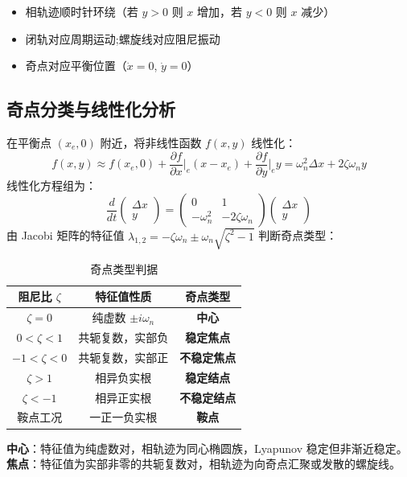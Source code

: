 \begin{itemize}
    \item 相轨迹顺时针环绕（若 $y>0$ 则 $x$ 增加，若 $y<0$ 则 $x$ 减少）
    \item 闭轨对应周期运动;螺旋线对应阻尼振动
    \item 奇点对应平衡位置（$\dot{x}=0$, $\dot{y}=0$）
\end{itemize}

\subsection{奇点分类与线性化分析}
在平衡点 $(x_e, 0)$ 附近，将非线性函数 $f(x,y)$ 线性化：
\[
f(x, y) \approx f(x_e, 0) + \frac{\partial f}{\partial x}\bigg|_{e}(x-x_e) + \frac{\partial f}{\partial y}\bigg|_{e} y = \omega_n^{2} \Delta x + 2\zeta \omega_n y
\]
线性化方程组为：
\[
\frac{d}{dt}\begin{pmatrix} \Delta x \\ y \end{pmatrix} = \begin{pmatrix} 0 & 1 \\ -\omega_n^{2} & -2\zeta\omega_n \end{pmatrix} \begin{pmatrix} \Delta x \\ y \end{pmatrix}
\]
由 Jacobi 矩阵的特征值 $\lambda_{1,2} = -\zeta\omega_n \pm \omega_n\sqrt{\zeta^{2}-1}$ 判断奇点类型：

\begin{table}[H]
\centering
\caption{奇点类型判据}
\begin{tabular}{ccc}
\toprule
阻尼比 $\zeta$ & 特征值性质 & 奇点类型 \\
\midrule
$\zeta = 0$ & 纯虚数 $\pm i\omega_n$ & \textbf{中心} \\
$0 < \zeta < 1$ & 共轭复数，实部负 & \textbf{稳定焦点} \\
$-1 < \zeta < 0$ & 共轭复数，实部正 & \textbf{不稳定焦点} \\
$\zeta > 1$ & 相异负实根 & \textbf{稳定结点} \\
$\zeta < -1$ & 相异正实根 & \textbf{不稳定结点} \\
鞍点工况 & 一正一负实根 & \textbf{鞍点} \\
\bottomrule
\end{tabular}
\label{tab:ch10_singular_pts}
\end{table}

\begin{definition}[中心 vs 焦点]
\textbf{中心}：特征值为纯虚数对，相轨迹为同心椭圆族，Lyapunov 稳定但非渐近稳定。\\
\textbf{焦点}：特征值为实部非零的共轭复数对，相轨迹为向奇点汇聚或发散的螺旋线。
\end{definition}

